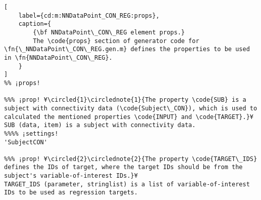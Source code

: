 \documentclass{tufte-handout}
\begin{document}
\begin{lstlisting}[
	label={cd:m:NNDataPoint_CON_REG:props},
	caption={
		{\bf NNDataPoint\_CON\_REG element props.}
		The \code{props} section of generator code for \fn{\_NNDataPoint\_CON\_REG.gen.m} defines the properties to be used in \fn{NNDataPoint\_CON\_REG}.
	}
]
%% ¡props!

%%% ¡prop! ¥\circled{1}\circlednote{1}{The property \code{SUB} is a subject with connectivity data (\code{Subject\_CON}), which is used to calculated the mentioned properties \code{INPUT} and \code{TARGET}.}¥
SUB (data, item) is a subject with connectivity data.
%%%% ¡settings!
'SubjectCON'

%%% ¡prop! ¥\circled{2}\circlednote{2}{The property \code{TARGET\_IDS} defines the IDs of target, where the target IDs should be from the subject's variable-of-interest IDs.}¥
TARGET_IDS (parameter, stringlist) is a list of variable-of-interest IDs to be used as regression targets.

\end{lstlisting}

\clearpage
\end{document}
